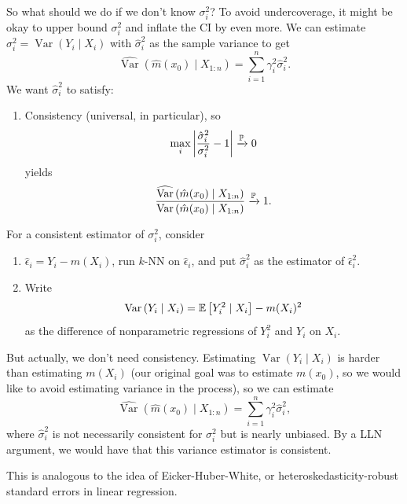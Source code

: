 So what should we do if we don't know $\sigma_i^2$? To avoid undercoverage, it might be okay to upper bound $\sigma_i^2$ and inflate the CI by even more.
We can estimate $\sigma_i^2 = \operatorname{Var}\left(Y_i \mid X_i\right)$ with $\hat{\sigma}_i^2$ as the sample variance to get \[
	\widehat{\operatorname{Var}}\left( \hat{m}(x_0) \mid X_{1:n} \right) = \sum\limits_{i=1}^{n} \gamma_i^2 \hat{\sigma}_i^2
.\] 
We want $\hat{\sigma}_i^2$ to satisfy:
\begin{enumerate}[label=(\roman*)]
	\item Consistency (universal, in particular), so \[
			\max_i \left| \frac{\hat{\sigma}_i^2}{\sigma_i^2} - 1 \right| \xrightarrow{\P} 0
	\] yields \[
		\frac{\widehat{\operatorname{Var}}\left(\hat{m}(x_0) \mid X_{1:n}\right)}{\operatorname{Var}\left(\hat{m}(x_0) \mid X_{1:n}\right)} \xrightarrow{\P} 1
	.\] 
\end{enumerate}

For a consistent estimator of $\sigma_i^2$, consider
\begin{enumerate}[label=(\roman*)]
	\item $\hat{\epsilon}_i = Y_i - m(X_i)$, run $k$-NN on $\hat{\epsilon}_i$, and put $\hat{\sigma}_i^2$ as the estimator of $\hat{\epsilon}_i^2$.
	\item Write \[
		\operatorname{Var}\left(Y_i \mid X_i\right) = \E\left[Y_i^2 \mid X_i\right]  - m(X_i)^2
	\] as the difference of nonparametric regressions of $Y_i^2$ and $Y_i$ on $X_i$.
\end{enumerate}

But actually, we don't need consistency. Estimating $\operatorname{Var}\left(Y_i \mid X_i\right)$ is harder than estimating $m(X_i)$ (our original goal was to estimate $m(x_0)$, so we would like to avoid estimating variance in the process), so we can estimate \[
	\hat{\operatorname{Var}}\left(\hat{m}(x_0) \mid X_{1:n}\right) = \sum\limits_{i=1}^{n} \gamma_i^2 \hat{\sigma}_i^2
,\] 
where $\hat{\sigma}_i^2$ is not necessarily consistent for $\sigma_i^2$ but is nearly unbiased. By a LLN argument, we would have that this variance estimator is consistent.

This is analogous to the idea of Eicker-Huber-White, or heteroskedasticity-robust standard errors in linear regression.

